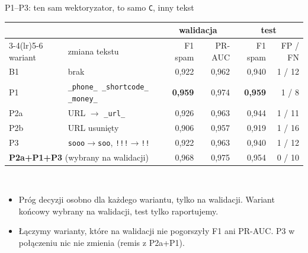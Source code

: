 \documentclass[aspectratio=169,10pt]{beamer}
\begin{document}
\begin{frame}{P1--P3: ten sam wektoryzator, to samo \texttt{C}, inny tekst}
  \small
  \centering
  \begin{tabular}{llrrrr}
    \toprule
    & & \multicolumn{2}{c}{walidacja} & \multicolumn{2}{c}{test} \\
    \cmidrule(lr){3-4}\cmidrule(lr){5-6}
    wariant & zmiana tekstu & F1 spam & PR-AUC & F1 spam & FP / FN \\
    \midrule
    B1  & brak                                  & 0,922 & 0,962 & 0,940 & 1 / 12 \\
    P1  & \texttt{\_phone\_ \_shortcode\_ \_money\_} & \textbf{0,959} & 0,974 & \textbf{0,959} & 1 / 8 \\
    P2a & URL $\to$ \texttt{\_url\_}             & 0,926 & 0,963 & 0,944 & 1 / 11 \\
    P2b & URL usunięty                          & 0,906 & 0,957 & 0,919 & 1 / 16 \\
    P3  & \texttt{sooo}$\to$\texttt{soo}, \texttt{!!!}$\to$\texttt{!!} & 0,922 & 0,963 & 0,940 & 1 / 12 \\
    \midrule
    \multicolumn{2}{l}{\textbf{P2a+P1+P3} (wybrany na walidacji)} & 0,968 & 0,975 & 0,954 & 0 / 10 \\
    \bottomrule
  \end{tabular}\\[1em]
  \raggedright
  \begin{itemize}
    \item Próg decyzji osobno dla każdego wariantu, tylko na walidacji. Wariant końcowy wybrany na walidacji, test tylko raportujemy.
    \item Łączymy warianty, które na walidacji nie pogorszyły F1 ani PR-AUC. P3 w połączeniu nic nie zmienia (remis z P2a+P1).
  \end{itemize}
\end{frame}
\end{document}
